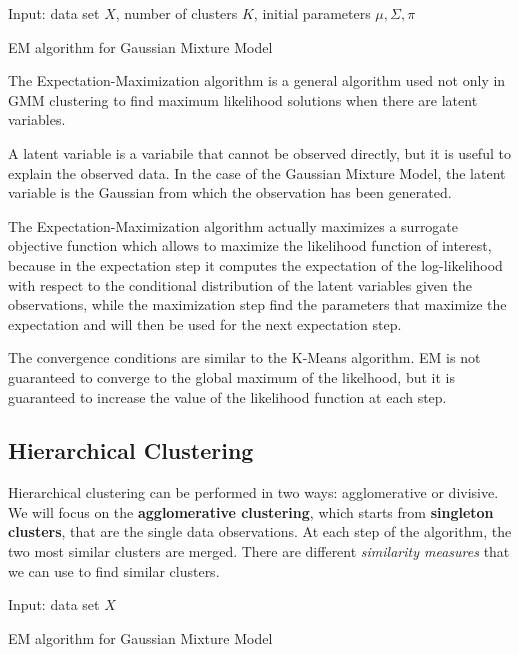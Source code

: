 \begin{algorithm}
    \SetAlgoLined
    Input: data set $X$, number of clusters $K$, initial parameters $\mu, \Sigma, \pi$ \\
    \caption{EM algorithm for Gaussian Mixture Model}
\end{algorithm}



The Expectation-Maximization algorithm is a general algorithm used not only in GMM clustering to find maximum likelihood solutions when there are latent variables.

A latent variable is a variabile that cannot be observed directly, but it is useful to explain the observed data. In the case of the Gaussian Mixture Model, the latent variable is the Gaussian from which the observation has been generated.

The Expectation-Maximization algorithm actually maximizes a surrogate objective function which allows to maximize the likelihood function of interest, because in the expectation step it computes the expectation of the log-likelihood with respect to the conditional distribution of the latent variables given the observations, while the maximization step find the parameters that maximize the expectation and will then be used for the next expectation step.

The convergence conditions are similar to the K-Means algorithm. EM is not guaranteed to converge to the global maximum of the likelhood, but it is guaranteed to increase the value of the likelihood function at each step.

\subsection*{Hierarchical Clustering}
Hierarchical clustering can be performed in two ways: agglomerative or divisive.
We will focus on the \textbf{agglomerative clustering}, which starts from \textbf{singleton clusters}, that are the single data observations. At each step of the algorithm, the two most similar clusters are merged. There are different \textit{similarity measures} that we can use to find similar clusters.

\begin{algorithm}
    \SetAlgoLined
    Input: data set $X$ \\
    \caption{EM algorithm for Gaussian Mixture Model}
\end{algorithm}

